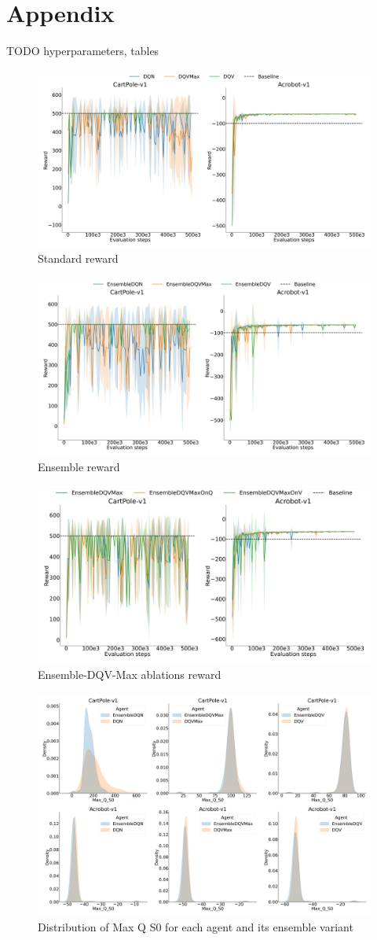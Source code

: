 \section{Appendix}\label{sec:appendix}
TODO hyperparameters, tables

\begin{figure}[!tbp]
  \centering
  \includegraphics[width=.5\textwidth]{img/dshift_plots_rwd.png}
  \caption{Standard reward}\label{fig:dshift_rwd}
\end{figure}

\begin{figure}[!tbp]
  \centering
  \includegraphics[width=.5\textwidth]{img/dshift_plots_ensembles_rwd.png}
  \caption{Ensemble reward}\label{fig:dshift_ensemble_rwd}
\end{figure}

\begin{figure}[!tbp]
  \centering
  \includegraphics[width=.5\textwidth]{img/dshift_plots_ablation_rwd.png}
  \caption{Ensemble-DQV-Max ablations reward}\label{fig:dshift_rwd_ablation}
\end{figure}

\begin{figure}[!tbp]
  \centering
  \includegraphics[width=.5\textwidth]{img/all_qv_dist.png}
  \caption{Distribution of Max Q S0 for each agent and its ensemble
    variant}\label{fig:qv_dist}
\end{figure}

